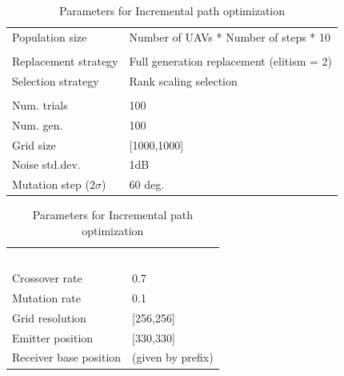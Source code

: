 \documentclass[10pt,a4paper]{book}
\begin{document}
\begin{table}[H]
\centering
\caption{Parameters for Incremental path optimization}
\begin{minipage}{60mm}
\small
\begin{tabular}{l l}
Population size & Number of UAVs * Number of steps * 10   \\  
& \\
Replacement strategy & Full generation replacement (elitism = 2) \\  
Selection strategy &  Rank scaling selection   \\  
& \\
Num. trials & 100  \\
Num. gen. & 100  \\
Grid size & [1000,1000] \\
Noise std.dev. & 1dB \\
Mutation step ($2\sigma$)  & 60 deg. 

\end{tabular}
\end{minipage}
\centering
\begin{minipage}{60mm}
\small
\begin{tabular}{l l}
& \\
& \\
& \\
& \\
& \\
Crossover rate & 0.7 \\ 
Mutation rate & 0.1  \\ 
Grid resolution & [256,256] \\
Emitter position & [330,330] \\
Receiver base position & (given by prefix)\\

\end{tabular}

\end{minipage}
\end{table}
\end{document}
